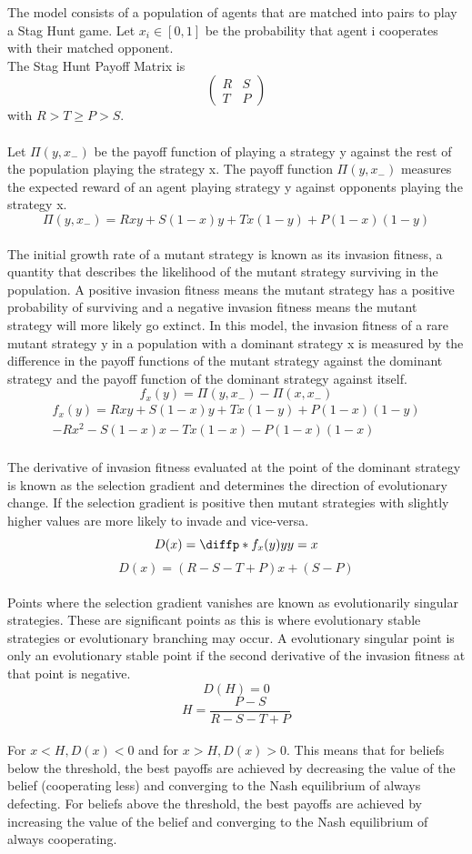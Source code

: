 \documentclass[]{llncs}
\begin{document}
The model consists of a population of agents that are matched into pairs to play a Stag Hunt game. Let $x_i \in [0,1]$ be the probability that agent i cooperates with their matched opponent. \\
The Stag Hunt Payoff Matrix is 
\[
  \begin{pmatrix} 
   R & S  \\
   T & P  
   \end{pmatrix} 
\]
with $ R > T \geq P > S. $ \\
\\
Let $ \Pi ( y, x_{-} )$ be the payoff function of playing a strategy y against the rest of the population playing the strategy x. The payoff function $ \Pi ( y, x_{-} )$ measures the expected reward of an agent playing strategy y against opponents playing the strategy x. 
\[
\Pi ( y, x_{-} ) = R x y + S (1-x) y +  T x (1-y) + P (1-x) (1-y)
\]
\\
The initial growth rate of a mutant strategy is known as its invasion fitness, a quantity that describes the likelihood of the mutant strategy surviving in the population. A positive invasion fitness means the mutant strategy has a positive probability of surviving and a negative invasion fitness means the mutant strategy will more likely go extinct. In this model, the invasion fitness of a rare mutant strategy y in a population with a dominant strategy x is measured by the difference in the payoff functions of the mutant strategy against the dominant strategy and the payoff function of the dominant strategy against itself. 
\[
f_x(y) = \Pi ( y, x_{-} ) - \Pi ( x, x_{-} )
\]
\begin{multline}
f_x(y) = R x y + S (1-x) y +  T x (1-y) + P (1-x) (1-y) \\ - R x^2 - S (1-x) x - T x (1-x) - P (1-x) (1-x)
\end{multline}
\\
The derivative of invasion fitness evaluated at the point of the dominant strategy is known as the selection gradient and determines the direction of evolutionary change. If the selection gradient is positive then mutant strategies with slightly higher values are more likely to invade and vice-versa. 
\[
D(x) = \diffp*{f_x(y)}{y}{y=x}
\]
\[
D(x) = (R - S - T +P) x + (S-P)
\]
\\
Points where the selection gradient vanishes are known as evolutionarily singular strategies. These are significant points as this is where evolutionary stable strategies or evolutionary branching may occur. A evolutionary singular point is only an evolutionary stable point if the second derivative of the invasion fitness at that point is negative. 
\[
D(H) = 0
\]
\[H = \frac{P-S}{R - S - T +P} 
\]
\\
For $x < H, D(x) < 0$ and for $x > H, D(x) > 0.$ This means that for beliefs below the threshold, the best payoffs are achieved by decreasing the value of the belief (cooperating less) and converging to the Nash equilibrium of always defecting. For beliefs above the threshold, the best payoffs are achieved by increasing the value of the belief and converging to the Nash equilibrium of always cooperating. 
\end{document}
